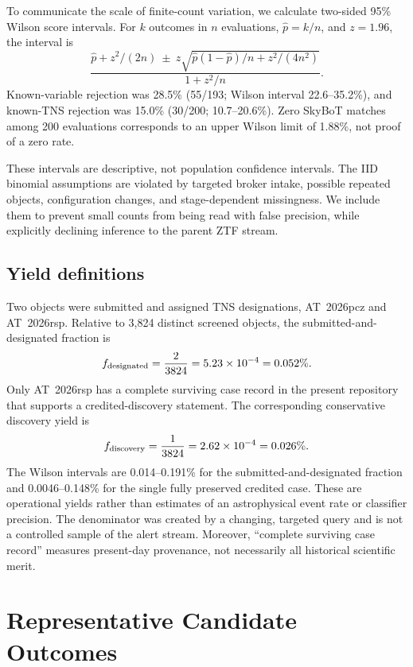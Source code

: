 \documentclass[11pt]{article}
\begin{document}
To communicate the scale of finite-count variation, we calculate two-sided 95\% Wilson score intervals. For $k$ outcomes in $n$ evaluations, $\hat p=k/n$, and $z=1.96$, the interval is
\begin{equation}
\frac{\hat p+z^2/(2n)\ \pm\ z\sqrt{\hat p(1-\hat p)/n+z^2/(4n^2)}}{1+z^2/n}.
\label{eq:wilson}
\end{equation}
Known-variable rejection was 28.5\% (55/193; Wilson interval 22.6--35.2\%), and known-TNS rejection was 15.0\% (30/200; 10.7--20.6\%). Zero SkyBoT matches among 200 evaluations corresponds to an upper Wilson limit of 1.88\%, not proof of a zero rate.

These intervals are descriptive, not population confidence intervals. The IID binomial assumptions are violated by targeted broker intake, possible repeated objects, configuration changes, and stage-dependent missingness. We include them to prevent small counts from being read with false precision, while explicitly declining inference to the parent ZTF stream.

\subsection{Yield definitions}

Two objects were submitted and assigned TNS designations, AT~2026pcz and AT~2026rsp. Relative to 3,824 distinct screened objects, the submitted-and-designated fraction is
\begin{equation}
  f_{\rm designated} = \frac{2}{3824} = 5.23\times10^{-4} = 0.052\%.
\end{equation}
Only AT~2026rsp has a complete surviving case record in the present repository that supports a credited-discovery statement. The corresponding conservative discovery yield is
\begin{equation}
  f_{\rm discovery} = \frac{1}{3824} = 2.62\times10^{-4} = 0.026\%.
\end{equation}
The Wilson intervals are 0.014--0.191\% for the submitted-and-designated fraction and 0.0046--0.148\% for the single fully preserved credited case. These are operational yields rather than estimates of an astrophysical event rate or classifier precision. The denominator was created by a changing, targeted query and is not a controlled sample of the alert stream. Moreover, ``complete surviving case record'' measures present-day provenance, not necessarily all historical scientific merit.

\section{Representative Candidate Outcomes}
\label{sec:cases}
\end{document}
